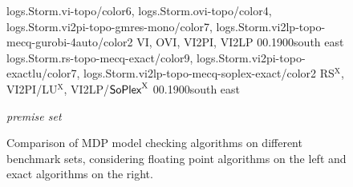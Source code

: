 \begin{figure*}[!htp]
%
	{
	logs.Storm.vi-topo/color6,
	logs.Storm.ovi-topo/color4,
	logs.Storm.vi2pi-topo-gmres-mono/color7,
	logs.Storm.vi2lp-topo-mecq-gurobi-4auto/color2
	}
	{VI, OVI, VI2PI, VI2LP}
	{0}{\numpremise}{0.1}{900}{south east}
	{
	logs.Storm.rs-topo-mecq-exact/color9,
	logs.Storm.vi2pi-topo-exactlu/color7,
	logs.Storm.vi2lp-topo-mecq-soplex-exact/color2
	}
	{RS$^\mathrm{X}$,  VI2PI/LU$^\mathrm{X}$,  VI2LP/$\textsf{SoPlex}^\mathrm{X}$}
	{0}{\numpremise}{0.1}{900}{south east}
	
	\textit{premise set}

	\caption{Comparison of MDP model checking algorithms on different benchmark sets, considering floating point algorithms on the left and exact algorithms on the right.}
	\label{fig:benchmarks}
\end{figure*}

